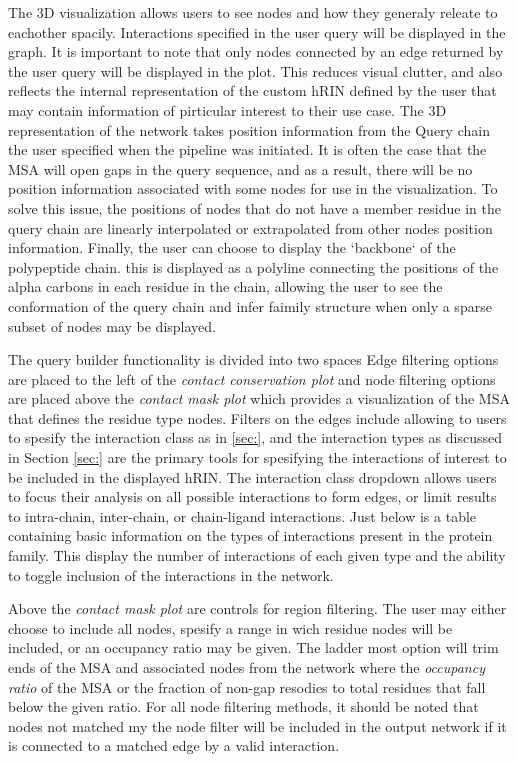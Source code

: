 The 3D visualization allows users to see nodes and how they generaly releate to eachother spacily. Interactions specified in the user query will be displayed in the graph. It is important to note that only nodes connected by an edge returned by the user query will be displayed in the plot. This reduces visual clutter, and also reflects the internal representation of the custom hRIN defined by the user that may contain information of pirticular interest to their use case. 
The 3D representation of the network takes position information from the Query chain the user specified when the pipeline was initiated. It is often the case that the MSA will open gaps in the query sequence, and as a result, there will be no position information associated with some nodes for use in the visualization. To solve this issue, the positions of nodes that do not have a member residue in the query chain are linearly interpolated or extrapolated from other nodes position information. 
Finally, the user can choose to display the `backbone` of the polypeptide chain. this is displayed as a polyline connecting the positions of the alpha carbons in each residue in the chain, allowing the user to see the conformation of the query chain and infer faimily structure when only a sparse subset of nodes may be displayed. 

The query builder functionality is divided into two spaces Edge filtering options are placed to the left of the \emph{contact conservation plot} and node filtering options are placed above the \emph{contact mask plot} which provides a visualization of the MSA that defines the residue type nodes. 
Filters on the edges include allowing to users to spesify the interaction class as in \ref{sec:}, and the interaction types as discussed in Section \ref{sec:} are the primary tools for spesifying the interactions of interest to be included in the displayed hRIN. The interaction class dropdown allows users to focus their analysis on all possible interactions to form edges, or limit results to intra-chain, inter-chain, or chain-ligand interactions. 
Just below is a table containing basic information on the types of interactions present in the protein family. This display the number of interactions of each given type and the ability to toggle inclusion of the interactions in the network. %

Above the \emph{contact mask plot} are controls for region filtering. The user may either choose to include all nodes, spesify a range in wich residue nodes will be included, or an occupancy ratio may be given. The ladder most option will trim ends of the MSA and associated nodes from the network where the \emph{occupancy ratio} of the MSA or the fraction of non-gap resodies to total residues that fall below the given ratio. For all node filtering methods, it should be noted that nodes not matched my the node filter will be included in the output network if it is connected to a matched edge by a valid interaction.